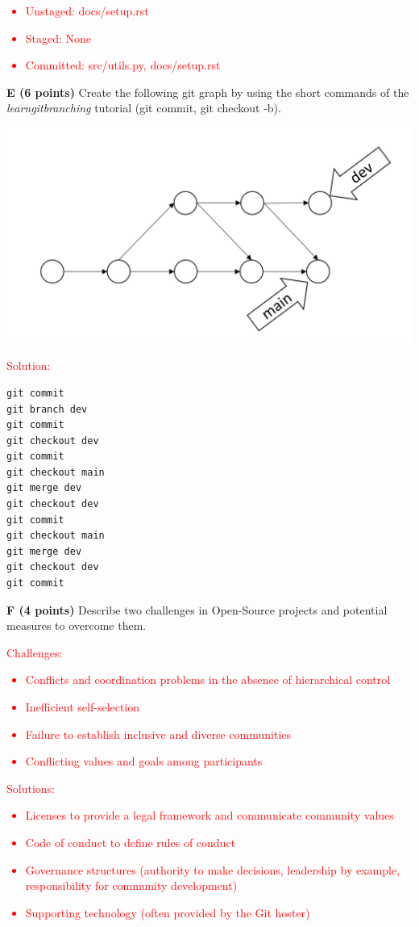 \documentclass[12pt]{scrartcl}
\begin{document}
\textcolor{red}{
	\begin{itemize}
		\item Unstaged: docs/setup.rst
		\item Staged: None
		\item Committed: src/utils.py, docs/setup.rst
	\end{itemize}
}

\newpage

\textbf{E (6 points)} Create the following git graph by using the short commands of the \textit{learngitbranching} tutorial (git commit, git checkout -b).

\vspace{1cm}
\begin{center}
	\includegraphics[scale=0.6]{git-graph_2.png}
\end{center}

\textcolor{red}{Solution:}
\begin{verbatim}
git commit
git branch dev
git commit
git checkout dev
git commit
git checkout main
git merge dev
git checkout dev
git commit
git checkout main
git merge dev
git checkout dev
git commit
\end{verbatim}

\newpage

\textbf{F (4 points)} Describe two challenges in Open-Source projects and potential measures to overcome them.

\textcolor{red}{
	Challenges:
	\begin{itemize}
		\item Conflicts and coordination problems in the absence of hierarchical control
		\item Inefficient self-selection
		\item Failure to establish inclusive and diverse communities
		\item Conflicting values and goals among participants
	\end{itemize}
Solutions:
	\begin{itemize}
	\item Licenses to provide a legal framework and communicate community values
	\item Code of conduct to define rules of conduct
	\item Governance structures (authority to make decisions, leadership by example, responsibility for community development)
	\item Supporting technology (often provided by the Git hoster)	
\end{itemize}
}
\end{document}
